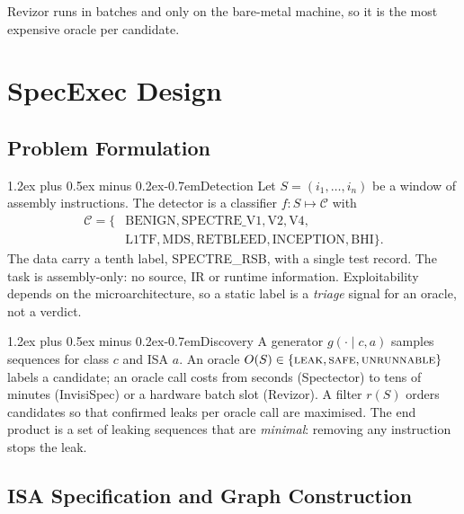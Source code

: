 \documentclass[conference]{IEEEtran}
\makeatletter
\renewcommand\paragraph{\@startsection{paragraph}{4}{\z@}%
  {1.2ex plus 0.5ex minus 0.2ex}{-0.7em}{\normalfont\normalsize\bfseries}}
\makeatother
\begin{document}
\noindent Revizor runs in batches and only on the bare-metal machine, so it is
the most expensive oracle per candidate.


\section{SpecExec Design}
\label{sec:methodology}

\subsection{Problem Formulation}
\label{sec:problem}

\paragraph{Detection}
Let $S = (i_1, \ldots, i_n)$ be a window of assembly instructions. The
detector is a classifier $f: S \mapsto \mathcal{C}$ with
\begin{align*}
  \mathcal{C} = \{&\text{BENIGN}, \text{SPECTRE\_V1}, \text{V2}, \text{V4},\\
                  &\text{L1TF}, \text{MDS}, \text{RETBLEED},
                   \text{INCEPTION}, \text{BHI}\}.
\end{align*}
The data carry a tenth label, SPECTRE\_RSB, with a single test record.
The task is assembly-only: no source, IR or runtime information.
Exploitability depends on the microarchitecture, so a static label is a
\emph{triage} signal for an oracle, not a verdict.

\paragraph{Discovery}
A generator $g(\cdot \mid c, a)$ samples sequences for class $c$ and ISA $a$.
An oracle $O(S) \in \{\textsc{leak}, \textsc{safe}, \textsc{unrunnable}\}$
labels a candidate; an oracle call costs from seconds (Spectector) to tens of
minutes (InvisiSpec) or a hardware batch slot (Revizor). A filter $r(S)$
orders candidates so that confirmed leaks per oracle call are maximised. The
end product is a set of leaking sequences that are \emph{minimal}: removing any
instruction stops the leak.

\subsection{ISA Specification and Graph Construction}
\label{sec:spec}
\end{document}

